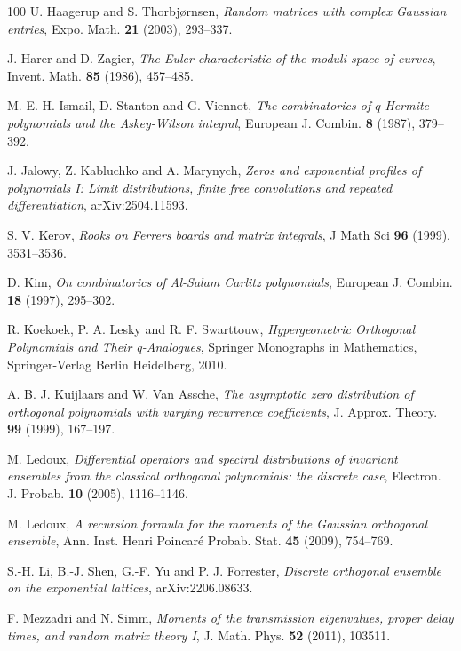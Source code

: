 \documentclass{amsart}
\theoremstyle{plain}
\theoremstyle{remark}
\numberwithin{equation}{section}
\begin{document}
\begin{thebibliography}{100}
 U. Haagerup and S. Thorbjørnsen, \emph{Random matrices with complex Gaussian entries}, Expo. Math. \textbf{21} (2003), 293--337.

 J. Harer and D. Zagier, \emph{The Euler characteristic of the moduli space of curves}, Invent. Math. \textbf{85} (1986), 457--485.

 

 M. E. H. Ismail, D. Stanton and G. Viennot, \emph{The combinatorics of $q$-Hermite polynomials and the Askey-Wilson integral}, European J. Combin. \textbf{8} (1987), 379--392.

 J. Jalowy, Z. Kabluchko and A. Marynych, \emph{Zeros and exponential profiles of polynomials I: Limit distributions, finite free convolutions and repeated differentiation}, arXiv:2504.11593.
 
 S. V. Kerov, \emph{Rooks on Ferrers boards and matrix integrals}, J Math Sci \textbf{96} (1999), 3531--3536.

 D. Kim, \textit{On combinatorics of Al-Salam Carlitz polynomials}, European J. Combin. \textbf{18} (1997), 295--302.

 
 R. Koekoek, P. A. Lesky and R. F. Swarttouw, \emph{Hypergeometric Orthogonal Polynomials and Their q-Analogues}, Springer Monographs in Mathematics, Springer-Verlag Berlin Heidelberg, 2010.  

 A. B. J. Kuijlaars and W. Van Assche, \emph{The asymptotic zero distribution of orthogonal polynomials with varying recurrence coefficients}, J. Approx. Theory. \textbf{99} (1999), 167--197.


 M. Ledoux, \emph{Differential operators and spectral distributions of invariant ensembles from the classical orthogonal polynomials: the discrete case}, Electron. J. Probab. \textbf{10} (2005), 1116--1146. 
 
 M. Ledoux, \emph{A recursion formula for the moments of the Gaussian orthogonal ensemble}, Ann. Inst. Henri Poincaré Probab. Stat. \textbf{45} (2009), 754--769.
 
 S.-H. Li, B.-J. Shen, G.-F. Yu and  P. J. Forrester, \emph{Discrete orthogonal ensemble on the exponential lattices}, arXiv:2206.08633.
  
 
 F. Mezzadri and N. Simm, \emph{Moments of the transmission eigenvalues, proper delay times, and random matrix theory I}, J. Math. Phys. \textbf{52} (2011), 103511.
 

\end{thebibliography}
\end{document}
